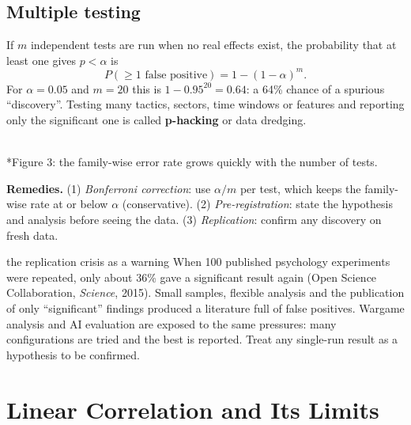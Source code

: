 \documentclass[11pt]{article}
\begin{document}
\subsection{Multiple testing}
If $m$ independent tests are run when no real effects exist, the probability that at least one gives $p<\alpha$ is
\[P(\ge1\text{ false positive})=1-(1-\alpha)^m.\]
For $\alpha=0.05$ and $m=20$ this is $1-0.95^{20}=0.64$: a 64\% chance of a spurious ``discovery''. Testing many tactics, sectors, time windows or features and reporting only the significant one is called \textbf{p-hacking} or data dredging.

\begin{center}\\*{\small\color{GreyN}Figure 3: the family-wise error rate grows quickly with the number of tests.}\end{center}

\textbf{Remedies.} (1) \emph{Bonferroni correction}: use $\alpha/m$ per test, which keeps the family-wise rate at or below $\alpha$ (conservative). (2) \emph{Pre-registration}: state the hypothesis and analysis before seeing the data. (3) \emph{Replication}: confirm any discovery on fresh data.

\begin{defence}{the replication crisis as a warning}
When 100 published psychology experiments were repeated, only about 36\% gave a significant result again (Open Science Collaboration, \textit{Science}, 2015). Small samples, flexible analysis and the publication of only ``significant'' findings produced a literature full of false positives. Wargame analysis and AI evaluation are exposed to the same pressures: many configurations are tried and the best is reported. Treat any single-run result as a hypothesis to be confirmed.
\end{defence}

\section{Linear Correlation and Its Limits}
\end{document}
